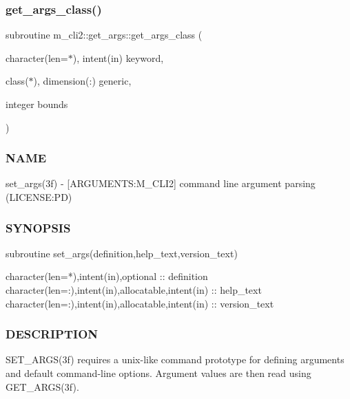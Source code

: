 \mbox{\label{interfacem__cli2_1_1get__args_a6f2594c5e547d1f41ed69150d07e6b54}} 
\subsubsection{\texorpdfstring{get\+\_\+args\+\_\+class()}{get\_args\_class()}}
{\footnotesize\ttfamily subroutine m\+\_\+cli2\+::get\+\_\+args\+::get\+\_\+args\+\_\+class (\begin{DoxyParamCaption}\item[{character(len=$\ast$), intent(in)}]{keyword,  }\item[{class($\ast$), dimension(\+:)}]{generic,  }\item[{integer}]{bounds }\end{DoxyParamCaption})\hspace{0.3cm}{\ttfamily [private]}}



\subsubsection*{N\+A\+ME}

set\+\_\+args(3f) -\/ \mbox{[}A\+R\+G\+U\+M\+E\+N\+TS\+:M\+\_\+\+C\+L\+I2\mbox{]} command line argument parsing (L\+I\+C\+E\+N\+SE\+:PD) 

\subsubsection*{S\+Y\+N\+O\+P\+S\+IS}

\begin{DoxyVerb} subroutine set_args(definition,help_text,version_text)

  character(len=*),intent(in),optional  :: definition
  character(len=:),intent(in),allocatable,intent(in) :: help_text
  character(len=:),intent(in),allocatable,intent(in) :: version_text
\end{DoxyVerb}
 \subsubsection*{D\+E\+S\+C\+R\+I\+P\+T\+I\+ON}

\begin{DoxyVerb} SET_ARGS(3f) requires a unix-like command prototype for defining
 arguments and default command-line options. Argument values are then
 read using GET_ARGS(3f).
\end{DoxyVerb}


